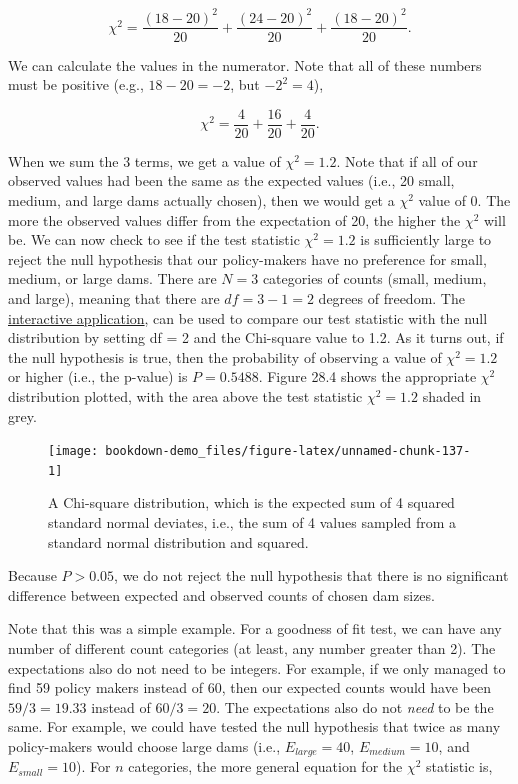 \documentclass[
]{scrbook}
\begin{document}
\[\chi^{2} = \frac{(18 - 20)^{2}}{20} + \frac{(24 - 20)^{2}}{20} + \frac{(18 - 20)^{2}}{20}.\]

We can calculate the values in the numerator.
Note that all of these numbers must be positive (e.g., \(18 - 20 = -2\), but \(-2^{2} = 4\)),

\[\chi^{2} = \frac{4}{20} + \frac{16}{20} + \frac{4}{20}.\]

When we sum the 3 terms, we get a value of \(\chi^{2} = 1.2\).
Note that if all of our observed values had been the same as the expected values (i.e., 20 small, medium, and large dams actually chosen), then we would get a \(\chi^{2}\) value of 0.
The more the observed values differ from the expectation of 20, the higher the \(\chi^{2}\) will be.
We can now check to see if the test statistic \(\chi^{2} = 1.2\) is sufficiently large to reject the null hypothesis that our policy-makers have no preference for small, medium, or large dams.
There are \(N = 3\) categories of counts (small, medium, and large), meaning that there are \(df = 3 - 1 = 2\) degrees of freedom.
The \href{https://bradduthie.shinyapps.io/chi-square/}{interactive application}, can be used to compare our test statistic with the null distribution by setting df = 2 and the Chi-square value to 1.2.
As it turns out, if the null hypothesis is true, then the probability of observing a value of \(\chi^{2} = 1.2\) or higher (i.e., the p-value) is \(P = 0.5488\).
Figure 28.4 shows the appropriate \(\chi^{2}\) distribution plotted, with the area above the test statistic \(\chi^{2} = 1.2\) shaded in grey.

\begin{figure}
\texttt{[image: bookdown-demo\_files/figure-latex/unnamed-chunk-137-1]} \caption{A Chi-square distribution, which is the expected sum of 4 squared standard normal deviates, i.e., the sum of 4 values sampled from a standard normal distribution and squared.}\label{fig:unnamed-chunk-137}
\end{figure}

Because \(P > 0.05\), we do not reject the null hypothesis that there is no significant difference between expected and observed counts of chosen dam sizes.

Note that this was a simple example.
For a goodness of fit test, we can have any number of different count categories (at least, any number greater than 2).
The expectations also do not need to be integers.
For example, if we only managed to find 59 policy makers instead of 60, then our expected counts would have been \(59/3 = 19.33\) instead of \(60/3 = 20\).
The expectations also do not \emph{need} to be the same.
For example, we could have tested the null hypothesis that twice as many policy-makers would choose large dams (i.e., \(E_{large} = 40\), \(E_{medium} = 10\), and \(E_{small} = 10\)).
For \(n\) categories, the more general equation for the \(\chi^{2}\) statistic is,
\end{document}
